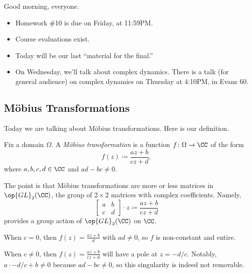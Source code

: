 \documentclass[../notes.tex]{subfiles}
\begin{document}

Good morning, everyone.
\begin{itemize}
	\item Homework \#10 is due on Friday, at 11:59PM.
	\item Course evaluations exist.
	\item Today will be our last ``material for the final.''
	\item On Wednesday, we'll talk about complex dynamics. There is a talk (for general audience) on complex dynamics on Thursday at 4:10PM, in Evans 60.
\end{itemize}

\subsection{M\"obius Transformations}
Today we are talking about M\"obius transformations. Here is our definition.
\begin{definition}
	Fix a domain $\Omega$. A \textit{M\"obius transformation} is a function $f\colon\Omega\to\CC$ of the form
	\[f(z)\coloneqq\frac{az+b}{cz+d},\]
	where $a,b,c,d\in\CC$ and $ad-bc\ne0$.
\end{definition}
The point is that M\"obius transformations are more or less matrices in $\op{GL}_2(\CC)$, the group of $2\times2$ matrices with complex coefficients. Namely,
\[\begin{bmatrix}
	a & b \\
	c & d
\end{bmatrix}\cdot z\coloneqq\frac{az+b}{cz+d}\]
provides a group action of $\op{GL}_2(\CC)$ on $\CC$.
\begin{example}
	When $c=0$, then $f(z)=\frac{az+b}{d}$ with $ad\ne0$, so $f$ is non-constant and entire.
\end{example}
\begin{example}
	When $c\ne0$, then $f(z)=\frac{az+b}{cz+d}$ will have a pole at $z=-d/c$. Notably, $a\cdot-d/c+b\ne0$ because $ad-bc\ne0$, so this singularity is indeed not removable.
\end{example}
\end{document}

